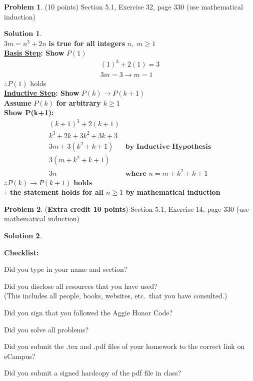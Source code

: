 \documentclass{article}
\theoremstyle{definition}
\newtheorem{problem}{Problem}
\newtheorem*{solution}{Solution}
\newcommand{\checklist}{\noindent\textbf{Checklist:}
\begin{compactitem}[$\Box$] 
\item Did you type in your name and section? 
\item Did you disclose all resources that you have used? \\
(This includes all people, books, websites, etc.\ that you have consulted.)
\item Did you sign that you followed the Aggie Honor Code? 
\item Did you solve all problems? 
\item Did you submit the .tex and .pdf files of your homework to the correct link on eCampus?
\item Did you submit a signed hardcopy of the pdf file in class? 
\end{compactitem}
}
\begin{document}
\begin{problem} (10 points)
Section 5.1, Exercise 32, page 330 (use mathematical induction)
\end{problem}
\begin{solution} \ \\
$3m = n^3+2n$ \textbf{is true for all integers} $n,\;m \ge 1 $ \\
\textbf{\underline{Basis Step}: Show} $P(1)$ \\
\begin{align*}
  (1)^3+2(1) = 3\\
  3m = 3 \rightarrow m = 1
\end{align*}
$\therefore P(1)$ holds \\
\textbf{\underline{Inductive Step}: Show } $P(k) \rightarrow P(k+1)$ \\
\textbf{Assume} $P(k)$ \textbf{for arbitrary $k \ge 1 $} \\
\textbf{Show P(k+1):} \\
\begin{align*}
  (k+1)^3 + 2(k+1) \\
   k^3 + 2k + 3k^2 + 3k + 3 \\
   3m + 3(k^2 + k + 1) &\textbf{by Inductive Hypothesis} \\
   3(m + k^2 + k + 1) \\
   3n\quad &\textbf{where $n=m + k^2 + k + 1$}
\end{align*}
$\therefore P(k) \rightarrow P(k+1)$ \textbf{holds}\\
$\therefore$ \textbf{the statement holds for all $n \ge 1 $ by mathematical induction} 
\end{solution}

\begin{problem} (\textbf{Extra credit 10 points})
Section 5.1, Exercise 14, page 330 (use mathematical induction)
\end{problem}
\begin{solution} 
\end{solution}

\goodbreak
\checklist
\end{document}
